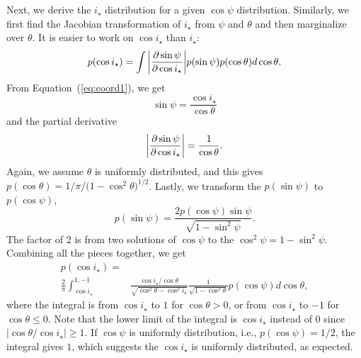 \documentclass[twocolumn,times]{aastex631}
\begin{document}
Next, we derive the $i_\star$ distribution for a given $\cos{\psi}$ distribution. Similarly, we first find the Jacobian transformation of $i_\star$ from $\psi$ and $\theta$ and then marginalize over $\theta$. It is easier to work on $\cos{i_\star}$ than $i_\star$:
\begin{equation}
    p(\cos{i_\star}) = \int \abs{\pdv{\sin{\psi}}{\cos{i_\star}}} p(\sin{\psi}) p(\cos{\theta}) d\cos{\theta}.
\end{equation}
From Equation~(\ref{eq:coord1}), we get 
\begin{equation}
    \sin{\psi} = \frac{\cos{i_\star}}{\cos{\theta}}
\end{equation} and the partial derivative
\begin{equation}
    \abs{\pdv{\sin{\psi}}{\cos{i_\star}}} = \frac{1}{\cos{\theta}}.
\end{equation} 
Again, we assume $\theta$ is uniformly distributed, and this gives $p(\cos{\theta}) = 1/\pi/(1-\cos^2{\theta)^{1/2}}$. Lastly, we transform the $p(\sin{\psi})$ to $p(\cos{\psi})$,
\begin{equation}
    p(\sin{\psi}) = \frac{2p(\cos{\psi})\sin{\psi}}{\sqrt{1-\sin^2{\psi}}}.
\end{equation}
The factor of 2 is from two solutions of $\cos{\psi}$ to the $\cos^2{\psi} = 1-\sin^2{\psi}$. Combining all the pieces together, we get
\begin{align}\label{eqn:jac_istar}
    p(\cos{i_\star}) = \nonumber\\ 
    \frac{2}{\pi} \int_{\cos{i_\star}}^{1,-1}& \frac{\cos{i_\star}/\cos{\theta}}{\sqrt{\cos^2{\theta}-\cos^2{i_\star}}}
    \frac{1}{\sqrt{1-\cos^2{\theta}}} p(\cos{\psi}) d\cos{\theta},
\end{align}
where the integral is from $\cos{i_\star}$ to $1$ for $\cos{\theta} > 0$, or from $\cos{i_\star}$ to $-1$ for $\cos{\theta} \leqslant 0$.
Note that the lower limit of the integral is $\cos{i_\star}$ instead of 0 since $\lvert \cos{\theta}/\cos{i_\star} \rvert \geqslant 1$.
If $\cos{\psi}$ is uniformly distribution, i.e., $p(\cos{\psi}) = 1/2$, the integral gives $1$, which suggests the $\cos{i_\star}$ is uniformly distributed, as expected.
\end{document}
